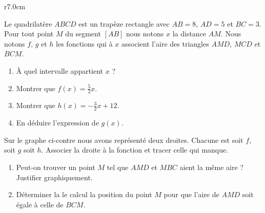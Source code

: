 
\begin{exercice}\label{exosmath-0552}

\begin{wrapfigure}{r}{7.0cm}
   \vspace{-0.5cm}        %
   \centering
   

   
\end{wrapfigure}

    Le quadrilatère \( ABCD\) est un trapèze rectangle avec \( AB=8\), \( AD=5\) et \( BC=3\). Pour tout point \( M\) du segment \( [AB]\) nous notons \( x\) la distance \( AM\). Nous notons \( f\), \( g\) et \( h\) les fonctions qui à \( x\) associent l'aire des triangles \( AMD\), \( MCD\) et \( BCM\).
    \begin{enumerate}
        \item
            À quel intervalle appartient \( x\) ?
        \item
            Montrer que \( f(x)=\frac{ 5 }{2}x\).
        \item
            Montrer que \( h(x)=-\frac{ 3 }{2}x+12\).
        \item
            En déduire l'expression de \( g(x)\).
    \end{enumerate}
    Sur le graphe ci-contre nous avons représenté deux droites. Chacune est soit \( f\), soit \( g\) soit \( h\). Associer la droite à la fonction et tracer celle qui manque.

    \begin{enumerate}
        \item
            Peut-on trouver un point \( M\) tel que \( AMD\) et \( MBC\) aient la même aire ? Justifier graphiquement.
        \item
            Déterminer la le calcul la position du point \( M\) pour que l'aire de \( AMD\) soit égale à celle de \( BCM\).
    \end{enumerate}

\end{exercice}
